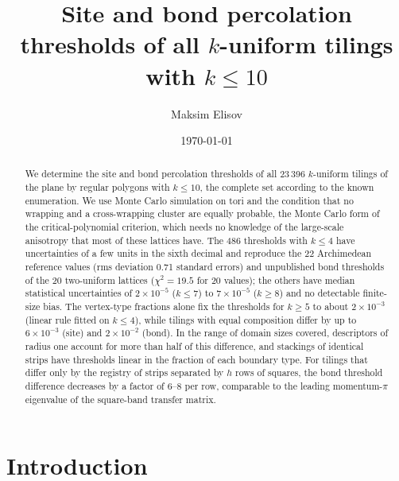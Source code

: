 \documentclass[pre,twocolumn,superscriptaddress,longbibliography,floatfix]{revtex4-2}
\begin{document}
\raggedbottom

\title{Site and bond percolation thresholds of all $k$-uniform tilings with $k\le 10$}

\author{Maksim Elisov}

\date{\today}

\begin{abstract}
We determine the site and bond percolation thresholds of all 23\,396 $k$-uniform tilings of the plane by regular polygons with $k\le 10$, the complete set according to the known enumeration. We use Monte Carlo simulation on tori and the condition that no wrapping and a cross-wrapping cluster are equally probable, the Monte Carlo form of the critical-polynomial criterion, which needs no knowledge of the large-scale anisotropy that most of these lattices have. The 486 thresholds with $k\le4$ have uncertainties of a few units in the sixth decimal and reproduce the 22 Archimedean reference values (rms deviation 0.71 standard errors) and unpublished bond thresholds of the 20 two-uniform lattices ($\chi^2=19.5$ for 20 values); the others have median statistical uncertainties of $2\times10^{-5}$ ($k\le7$) to $7\times10^{-5}$ ($k\ge8$) and no detectable finite-size bias. The vertex-type fractions alone fix the thresholds for $k\ge5$ to about $2\times10^{-3}$ (linear rule fitted on $k\le4$), while tilings with equal composition differ by up to $6\times10^{-3}$ (site) and $2\times10^{-2}$ (bond). In the range of domain sizes covered, descriptors of radius one account for more than half of this difference, and stackings of identical strips have thresholds linear in the fraction of each boundary type. For tilings that differ only by the registry of strips separated by $h$ rows of squares, the bond threshold difference decreases by a factor of 6--8 per row, comparable to the leading momentum-$\pi$ eigenvalue of the square-band transfer matrix.
\end{abstract}

\maketitle

\section{Introduction}
\end{document}
